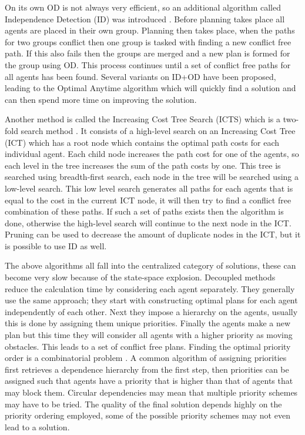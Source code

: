 \documentclass[a4paper]{article}
\begin{document}
On its own OD is not always very efficient, so an additional algorithm called
Independence Detection (ID) was introduced \cite{standley2010}. Before planning
takes place all agents are placed in their own group. Planning then takes
place, when the paths for two groups conflict then one group is tasked with
finding a new conflict free path. If this also fails then the groups are merged
and a new plan is formed for the group using OD. This process continues until a
set of conflict free paths for all agents has been found. Several variants on
ID+OD have been proposed, leading to the Optimal Anytime algorithm
\cite{standley2011} which will quickly find a solution and can then spend more
time on improving the solution.

Another method is called the Increasing Cost Tree Search (ICTS) which is a
two-fold search method \cite{sharon2013}. It consists of a high-level search on
an Increasing Cost Tree (ICT) which has a root node which contains the optimal
path costs for each individual agent. Each child node increases the path cost
for one of the agents, so each level in the tree increases the sum of the path
costs by one. This tree is searched using breadth-first search, each node in
the tree will be searched using a low-level search. This low level search
generates all paths for each agents that is equal to the cost in the current
ICT node, it will then try to find a conflict free combination of these paths.
If such a set of paths exists then the algorithm is done, otherwise the
high-level search will continue to the next node in the ICT. Pruning can be
used to decrease the amount of duplicate nodes in the ICT, but it is possible
to use ID as well.

The above algorithms all fall into the centralized category of solutions, these
can become very slow because of the state-space explosion. Decoupled methods
reduce the calculation time by considering each agent separately. They
generally use the same approach; they start with constructing optimal plans for
each agent independently of each other. Next they impose a hierarchy on the
agents, usually this is done by assigning them unique priorities. Finally the
agents make a new plan but this time they will consider all agents with a
higher priority as moving obstacles. This leads to a set of conflict free
plans. Finding the optimal priority order is a combinatorial problem
\cite{bennewitz2002}. A common algorithm of assigning priorities first
retrieves a dependence hierarchy from the first step, then priorities can be
assigned such that agents have a priority that is higher than that of agents
that may block them. Circular dependencies may mean that multiple priority
schemes may have to be tried. The quality of the final solution depends highly
on the priority ordering employed, some of the possible priority schemes may
not even lead to a solution.
\end{document}

